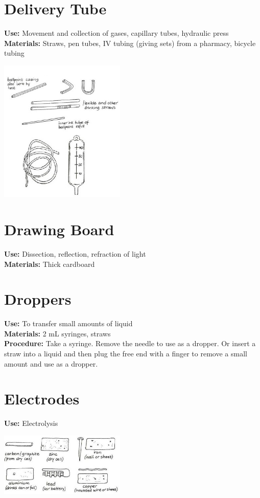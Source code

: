 \begin{multicols}{2}
\section{Delivery Tube}
\label{sec:delivery-tube}
\vspace{-10pt}
\textbf{Use:} Movement and collection of gases, capillary tubes, hydraulic press\\
\textbf{Materials:} Straws, pen tubes, IV tubing (giving sets) from a pharmacy, bicycle tubing
\begin{center}
\includegraphics[width=0.45\textwidth]{./img/vso/tubes.jpg}
\end{center}

\section{Drawing Board}
\label{sec:drawing-board}
\vspace{-10pt}
\textbf{Use:} Dissection, reflection, refraction of light\\
\textbf{Materials:} Thick cardboard

\section{Droppers}
\label{sec:droppers}
\vspace{-10pt}
\textbf{Use:} To transfer small amounts of liquid \\
\textbf{Materials:} 2 mL syringes, straws\\
\textbf{Procedure:} Take a syringe. Remove the needle to use as a dropper. Or insert a straw into a liquid and then plug the free end with a finger to remove a small amount and use as a dropper.

\section{Electrodes}
\label{sec:electrodes}
\vspace{-10pt}
\textbf{Use:} Electrolysis
\begin{center}
\includegraphics[width=0.45\textwidth]{./img/vso/electrodes.jpg}
\end{center}


\end{multicols}
